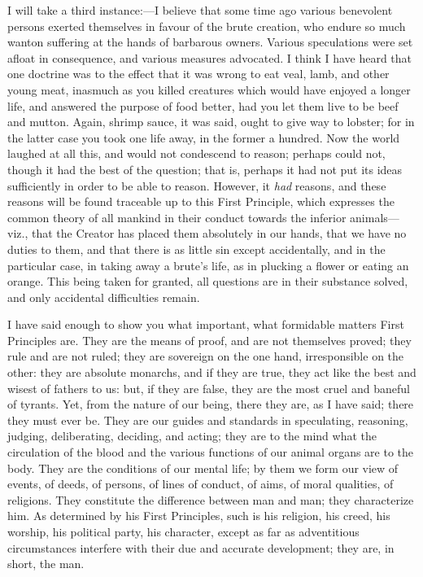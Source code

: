 I will take a third instance:—I believe that some
time ago various benevolent persons exerted themselves in
favour of the brute creation, who endure so much wanton
suffering at the hands of barbarous owners. Various
speculations were set afloat in consequence, and various
measures advocated. I think I have heard that one
doctrine was to the effect that it was wrong to eat veal,
lamb, and other young meat, inasmuch as you killed
creatures which would have enjoyed a longer life, and
answered the purpose of food better, had you let them
live to be beef and mutton. Again, shrimp sauce, it was
said, ought to give way to lobster; for in the latter
case you took one life away, in the former a hundred. Now
the world laughed at all this, and would not condescend
to reason; perhaps could not, though it had the best of
the question; that is, perhaps it had not put its ideas
sufficiently in order to be able to reason. However, it \emph{had}
reasons, and these reasons will be found traceable up to
this First Principle, which expresses the common theory
of all mankind in their conduct towards the inferior
animals—viz., that the Creator has placed them
absolutely in our hands, that we have no duties to them,
and that there is as little sin except accidentally, and
in the particular case, in taking away a brute's life, as
in plucking a flower or eating an orange. This being
taken for granted, all questions are in their substance
solved, and only accidental difficulties remain.

I have said enough to show you what important, what
formidable matters First Principles are. They are the
means of proof, and are not themselves proved; they rule
and are not ruled; they are sovereign on the one hand,
irresponsible on the other: they are absolute monarchs,
and if they are true, they act like the best and wisest
of fathers to us: but, if they are false, they are the
most cruel and baneful of tyrants. Yet, from the nature
of our being, there they are, as I have said; there they
must ever be. They are our guides and standards in
speculating, reasoning, judging, deliberating, deciding,
and acting; they are to the mind what the circulation of
the blood and the various functions of our animal organs
are to the body. They are the conditions of our mental
life; by them we form our view of events, of deeds, of
persons, of lines of conduct, of aims, of moral
qualities, of religions. They constitute the difference
between man and man; they characterize him. As determined
by his First Principles, such is his religion, his creed,
his worship, his political party, his character, except
as far as adventitious circumstances interfere with their
due and accurate development; they are, in short, the man.

